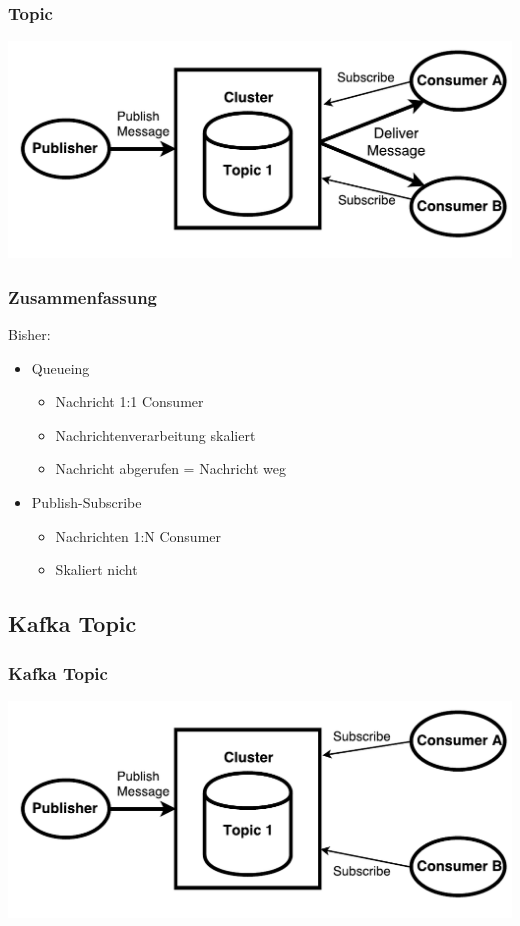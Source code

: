 \begin{frame}
\frametitle{Topic}
	\centering
	\includegraphics[scale=0.6]{figure/topic_draw.pdf}
\end{frame}

\begin{frame}
\frametitle{Zusammenfassung}

Bisher: 
\begin{itemize}
	\item Queueing
	\begin{itemize}
		\item Nachricht 1:1 Consumer
		\item Nachrichtenverarbeitung skaliert
		\item Nachricht abgerufen = Nachricht weg
	\end{itemize}
	\item Publish-Subscribe
	\begin{itemize}
		\item Nachrichten 1:N Consumer
		\item Skaliert nicht  			%
	\end{itemize}
\end{itemize}
\end{frame}

\subsection{Kafka Topic}
\begin{frame}
\frametitle{Kafka Topic}
\centering
\includegraphics[scale=0.6]{figure/Kafka_topic_draw_subscribe.pdf}
\end{frame}

